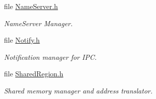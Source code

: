 \begin{DoxyCompactItemize}
file \hyperlink{_name_server_8h}{Name\-Server.\-h}
\begin{DoxyCompactList}\small\item\em Name\-Server Manager. \end{DoxyCompactList}\item 
file \hyperlink{_notify_8h}{Notify.\-h}
\begin{DoxyCompactList}\small\item\em Notification manager for I\-P\-C. \end{DoxyCompactList}\item 
file \hyperlink{_shared_region_8h}{Shared\-Region.\-h}
\begin{DoxyCompactList}\small\item\em Shared memory manager and address translator. \end{DoxyCompactList}\end{DoxyCompactItemize}
